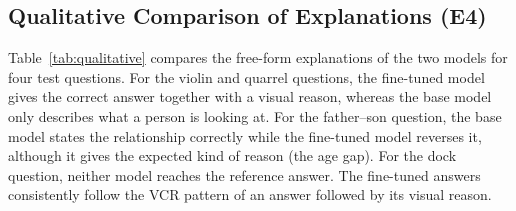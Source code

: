 \documentclass[12pt,a4paper,oneside]{report}
\begin{document}
\subsection{Qualitative Comparison of Explanations (E4)}

Table~\ref{tab:qualitative} compares the free-form explanations of the two
models for four test questions. For the violin and quarrel questions, the
fine-tuned model gives the correct answer together with a visual reason,
whereas the base model only describes what a person is looking at. For the
father--son question, the base model states the relationship correctly while
the fine-tuned model reverses it, although it gives the expected kind of reason
(the age gap). For the dock question, neither model reaches the reference
answer. The fine-tuned answers consistently follow the VCR pattern of an answer
followed by its visual reason.
\end{document}
